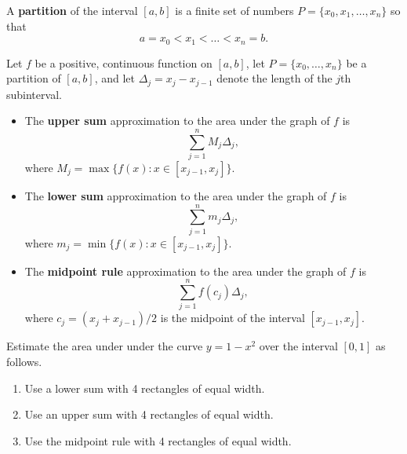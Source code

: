 \begin{definition}
A \textbf{partition} of the interval $[a,b]$ is a finite set of numbers $P=\{x_0,x_1,\dots, x_n\}$ so that
\begin{equation*}
a=x_0<x_1<\dots < x_n=b.
\end{equation*}
\end{definition}
\begin{definition}
Let $f$ be a positive, continuous function on $[a,b]$, let $P=\{x_0,\dots, x_n\}$ be a partition of $[a,b]$, and let $\Delta_j=x_j-x_{j-1}$ denote the length of the $j$th subinterval.
\begin{itemize}
\item The \textbf{upper sum} approximation to the area under the graph of $f$ is
\begin{equation*}
\sum_{j=1}^n M_j\Delta_j,
\end{equation*}
where $M_j=\max\big\{f(x) : x\in [x_{j-1}, x_j]\big\}$.
\item The \textbf{lower sum} approximation to the area under the graph of $f$ is
\begin{equation*}
\sum_{j=1}^n m_j\Delta_j,
\end{equation*}
where $m_j=\min\big\{f(x) : x\in [x_{j-1}, x_j]\big\}$.
\item The \textbf{midpoint rule} approximation to the area under the graph of $f$ is
\begin{equation*}
\sum_{j=1}^nf(c_j)\Delta_j,
\end{equation*}
where $c_j=(x_j+x_{j-1})/2$ is the midpoint of the interval $[x_{j-1}, x_j]$.
\end{itemize}
\end{definition}

\begin{example}
Estimate the area under under the curve $y=1-x^2$ over the interval $[0,1]$ as follows.
\begin{enumerate}[label=(\alph*)]
\item Use a lower sum with 4 rectangles of equal width.
\vfill
\newpage
\item Use an upper sum with 4 rectangles of equal width.
\vfill
\item Use the midpoint rule with 4 rectangles of equal width.
\vfill
\end{enumerate}
\end{example}

